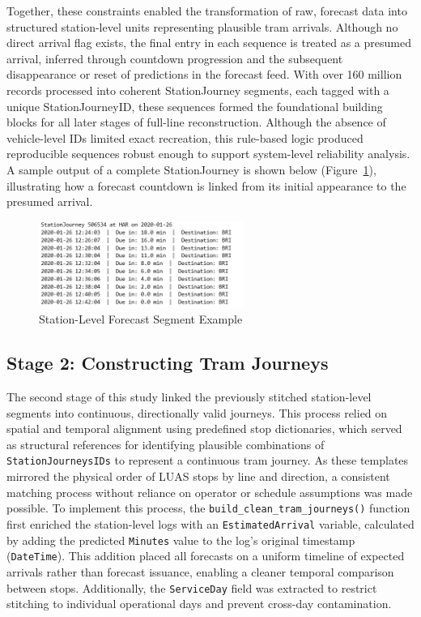     Together, these constraints enabled the transformation of raw, forecast data into structured station-level units representing plausible tram arrivals. Although no direct arrival flag exists, the final entry in each sequence is treated as a presumed arrival, inferred through countdown progression and the subsequent disappearance or reset of predictions in the forecast feed. With over 160 million records processed into coherent StationJourney segments, each tagged with a unique StationJourneyID, these sequences formed the foundational building blocks for all later stages of full-line reconstruction. Although the absence of vehicle-level IDs limited exact recreation, this rule-based logic produced reproducible sequences robust enough to support system-level reliability analysis. A sample output of a complete StationJourney is shown below (Figure~\ref{fig:station-level}), illustrating how a forecast countdown is linked from its initial appearance to the presumed arrival.

\begin{figure}[H]
  \centering
  \includegraphics[width=0.6\textwidth]{figures/paper_figures/station_level.png}
  \caption{Station-Level Forecast Segment Example}
  \label{fig:station-level}
\end{figure}

\subsection*{Stage 2: Constructing Tram Journeys}

    The second stage of this study linked the previously stitched station-level segments into continuous, directionally valid journeys. This process relied on spatial and temporal alignment using predefined stop dictionaries, which served as structural references for identifying plausible combinations of \texttt{StationJourneysIDs} to represent a continuous tram journey. As these templates mirrored the physical order of LUAS stops by line and direction, a consistent matching process without reliance on operator or schedule assumptions was made possible. To implement this process, the \texttt{build\_clean\_tram\_journeys()} function first enriched the station-level logs with an \texttt{EstimatedArrival} variable, calculated by adding the predicted \texttt{Minutes} value to the log’s original timestamp (\texttt{DateTime}). This addition placed all forecasts on a uniform timeline of expected arrivals rather than forecast issuance, enabling a cleaner temporal comparison between stops. Additionally, the \texttt{ServiceDay} field was extracted to restrict stitching to individual operational days and prevent cross-day contamination.

